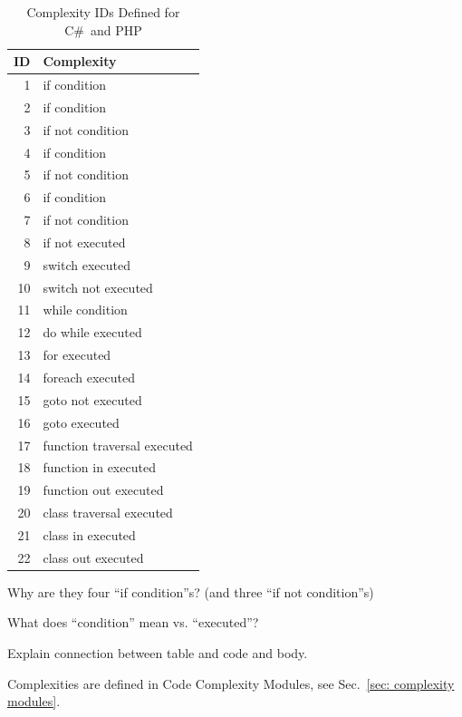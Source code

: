 \documentclass[12pt]{article}
\newcommand{\CSharp}{C{\fontseries{b}\selectfont\#}}
\begin{document}
\begin{table}[H]
\centering
\begin{tabular}{|r|l|}
\hline
\textbf{ID} & \textbf{Complexity} \\
\hline
 1 & if condition \\
\hline
 2 & if condition \\
\hline
 3 & if not condition \\
\hline
 4 & if condition \\
\hline
 5 & if not condition \\
\hline
 6 & if condition \\
\hline
 7 & if not condition \\
 \hline
 8 & if not executed \\
\hline
 9 & switch executed \\
\hline
10 & switch not executed \\
\hline
11 & while condition \\
\hline

12 & do while executed \\
\hline
13 & for executed \\
\hline
14 & foreach executed \\
\hline
15 & goto not executed \\
\hline
16 & goto executed \\
\hline
17 & function traversal executed \\
\hline
18 & function in executed \\
\hline
19 & function out executed \\
\hline
20 & class traversal executed \\
\hline
21 & class in executed \\
\hline
22 & class out executed \\
\hline
\end{tabular}
\caption{Complexity IDs Defined for \CSharp\ and PHP}
\label{tab:complexity IDs}
\end{table}

{\Large Why are they four ``if condition''s? (and three ``if not condition''s)}

{\Large What does ``condition'' mean vs. ``executed''?}

{\Large Explain connection between table and code and body.}

Complexities are defined in Code Complexity Modules, see
Sec.~\ref{sec: complexity modules}.
\end{document}
